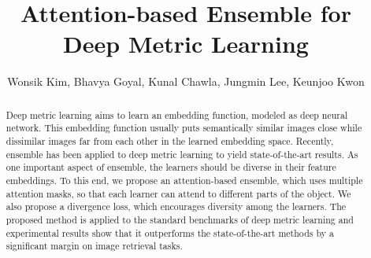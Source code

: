 \documentclass[runningheads]{llncs}
\begin{document}
\title{Attention-based Ensemble for \\Deep Metric Learning}



\author{Wonsik Kim, Bhavya Goyal, Kunal Chawla, Jungmin Lee, Keunjoo Kwon}


\maketitle

\def\onedot{.}
\def\eg{\emph{e.g}\onedot} \def\Eg{\emph{E.g}\onedot}
\def\ie{\emph{i.e}\onedot} \def\Ie{\emph{I.e}\onedot}
\def\cf{\emph{c.f}\onedot} \def\Cf{\emph{C.f}\onedot}
\def\etc{\emph{etc}\onedot} \def\vs{\emph{vs}\onedot}
\def\wrt{w.r.t\onedot} \def\dof{d.o.f\onedot}
\def\etal{\emph{et al}\onedot}
\def\ensemblefunc{b}
\def\Ensemblefunc{B}
\def\ensemblesub{m}
\def\Ensemblesub{M}





\begin{abstract}
\vspace{-8mm}
Deep metric learning aims to learn an embedding function, modeled as deep neural network.
This embedding function usually puts semantically similar images close
while dissimilar images far from each other in the learned embedding space.
Recently, ensemble has been applied to deep metric learning to yield state-of-the-art results.
As one important aspect of ensemble, the learners should
be diverse in their feature embeddings. To this end, we propose an attention-based ensemble,
which uses multiple attention masks, so that each learner can attend to different parts of the
object. We also propose a divergence loss, which encourages diversity among the learners.
The proposed method is applied to the standard benchmarks of deep metric learning and
experimental results show that it outperforms the state-of-the-art methods by a significant
margin on image retrieval tasks.
\vspace{-4mm}
\vspace{-4mm}
\end{abstract}
 
\end{document}
